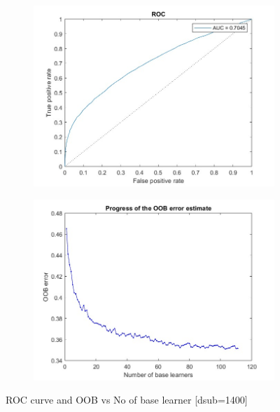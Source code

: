 \begin{figure}[H]
    \begin{subfigure}[b]{0.5\textwidth}
        \includegraphics[width=\textwidth]{img/1400/gray1400roc.jpg}
    \end{subfigure}
    \hfill
    \begin{subfigure}[b]{0.5\textwidth}
        \includegraphics[width=\textwidth]{img/1400/gray1400saturate.jpg}
    \end{subfigure}
    \caption{ROC curve and OOB vs No of base learner [dsub=1400]}
\end{figure}

